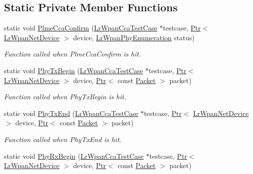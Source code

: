 \subsection*{Static Private Member Functions}
\begin{DoxyCompactItemize}
\item 
static void \hyperlink{classLrWpanCcaTestCase_af740f571b9d8594701c82480c8ff9632}{Plme\+Cca\+Confirm} (\hyperlink{classLrWpanCcaTestCase}{Lr\+Wpan\+Cca\+Test\+Case} $\ast$testcase, \hyperlink{classns3_1_1Ptr}{Ptr}$<$ \hyperlink{classns3_1_1LrWpanNetDevice}{Lr\+Wpan\+Net\+Device} $>$ device, \hyperlink{group__lr-wpan_ga6494269d13d45c511a07b7ccbb1de754}{Lr\+Wpan\+Phy\+Enumeration} status)
\begin{DoxyCompactList}\small\item\em Function called when Plme\+Cca\+Confirm is hit. \end{DoxyCompactList}\item 
static void \hyperlink{classLrWpanCcaTestCase_a23a0238970a4597eb0e6f90cd5a2f5f5}{Phy\+Tx\+Begin} (\hyperlink{classLrWpanCcaTestCase}{Lr\+Wpan\+Cca\+Test\+Case} $\ast$testcase, \hyperlink{classns3_1_1Ptr}{Ptr}$<$ \hyperlink{classns3_1_1LrWpanNetDevice}{Lr\+Wpan\+Net\+Device} $>$ device, \hyperlink{classns3_1_1Ptr}{Ptr}$<$ const \hyperlink{classns3_1_1Packet}{Packet} $>$ packet)
\begin{DoxyCompactList}\small\item\em Function called when Phy\+Tx\+Begin is hit. \end{DoxyCompactList}\item 
static void \hyperlink{classLrWpanCcaTestCase_a10eb0d8851c2e8de313448bb2da6fd30}{Phy\+Tx\+End} (\hyperlink{classLrWpanCcaTestCase}{Lr\+Wpan\+Cca\+Test\+Case} $\ast$testcase, \hyperlink{classns3_1_1Ptr}{Ptr}$<$ \hyperlink{classns3_1_1LrWpanNetDevice}{Lr\+Wpan\+Net\+Device} $>$ device, \hyperlink{classns3_1_1Ptr}{Ptr}$<$ const \hyperlink{classns3_1_1Packet}{Packet} $>$ packet)
\begin{DoxyCompactList}\small\item\em Function called when Phy\+Tx\+End is hit. \end{DoxyCompactList}\item 
static void \hyperlink{classLrWpanCcaTestCase_a7d236bfc6109f581582255227b8dee77}{Phy\+Rx\+Begin} (\hyperlink{classLrWpanCcaTestCase}{Lr\+Wpan\+Cca\+Test\+Case} $\ast$testcase, \hyperlink{classns3_1_1Ptr}{Ptr}$<$ \hyperlink{classns3_1_1LrWpanNetDevice}{Lr\+Wpan\+Net\+Device} $>$ device, \hyperlink{classns3_1_1Ptr}{Ptr}$<$ const \hyperlink{classns3_1_1Packet}{Packet} $>$ packet)

\end{DoxyCompactItemize}

